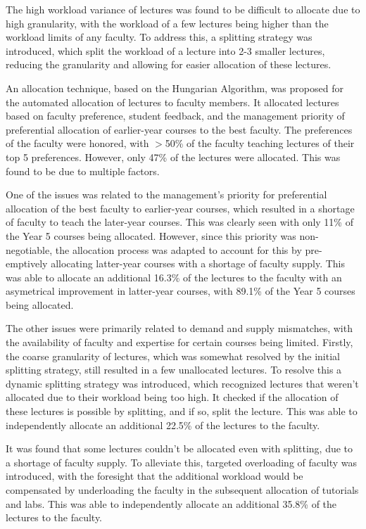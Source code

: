 The high workload variance of lectures was found to be difficult to allocate due to high granularity, with the workload of a few lectures being higher than the workload limits of any faculty. To address this, a splitting strategy was introduced, which split the workload of a lecture into 2-3 smaller lectures, reducing the granularity and allowing for easier allocation of these lectures.

An allocation technique, based on the Hungarian Algorithm, was proposed for the automated allocation of lectures to faculty members. It allocated lectures based on faculty preference, student feedback, and the management priority of preferential allocation of earlier-year courses to the best faculty. The preferences of the faculty were honored, with $>$50\% of the faculty teaching lectures of their top 5 preferences. However, only 47\% of the lectures were allocated. This was found to be due to multiple factors.

One of the issues was related to the management's priority for preferential allocation of the best faculty to earlier-year courses, which resulted in a shortage of faculty to teach the later-year courses. This was clearly seen with only 11\% of the Year 5 courses being allocated. However, since this priority was non-negotiable, the allocation process was adapted to account for this by pre-emptively allocating latter-year courses with a shortage of faculty supply. This was able to allocate an additional 16.3\% of the lectures to the faculty with an asymetrical improvement in latter-year courses, with 89.1\% of the Year 5 courses being allocated.

The other issues were primarily related to demand and supply mismatches, with the availability of faculty and expertise for certain courses being limited. Firstly, the coarse granularity of lectures, which was somewhat resolved by the initial splitting strategy, still resulted in a few unallocated lectures. To resolve this a dynamic splitting strategy was introduced, which recognized lectures that weren't allocated due to their workload being too high. It checked if the allocation of these lectures is possible by splitting, and if so, split the lecture. This was able to independently allocate an additional 22.5\% of the lectures to the faculty.

It was found that some lectures couldn't be allocated even with splitting, due to a shortage of faculty supply. To alleviate this, targeted overloading of faculty was introduced, with the foresight that the additional workload would be compensated by underloading the faculty in the subsequent allocation of tutorials and labs. This was able to independently allocate an additional 35.8\% of the lectures to the faculty.

